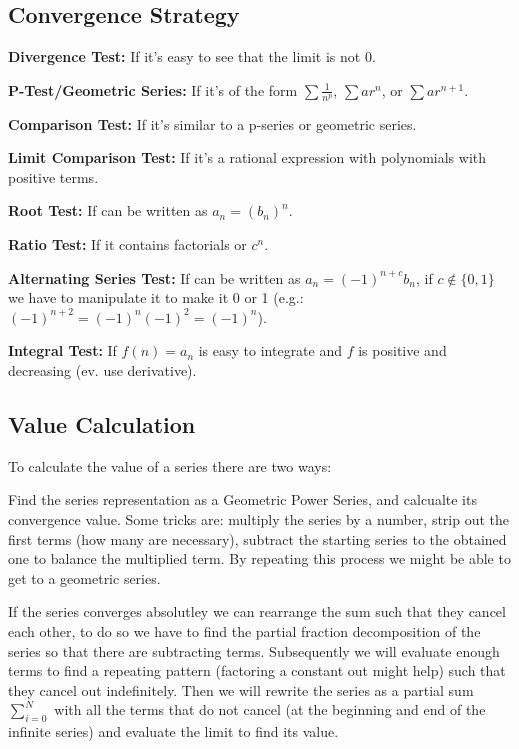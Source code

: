 \documentclass[8pt,a4paper]{extarticle}     %
\theoremstyle{definition}
\theoremstyle{definition}
\theoremstyle{definition}
\begin{document}
\begin{multicols}{4}
\subsection{Convergence Strategy}
\begin{numberlist}
	\item \textbf{Divergence Test:} If it's easy to see that the limit is not 0. 
	\item \textbf{P-Test/Geometric Series:} If it's of the form $\sum \frac{1}{n^p}$, $\sum ar^n$, or $\sum ar^{n+1}$.
	\item \textbf{Comparison Test:} If it's similar to a p-series or geometric series. 
	\item \textbf{Limit Comparison Test:} If it's a rational expression with polynomials with positive terms.
	\item \textbf{Root Test:} If can be written as $a_n = (b_n)^n$.
	\item \textbf{Ratio Test:} If it contains factorials or $c^n$.
	\item \textbf{Alternating Series Test:} If can be written as $a_n=(-1)^{n+c}b_n$, if $c\notin\{0,1\}$ we have to manipulate it to make it 0 or 1 (e.g.: $(-1)^{n+2} = (-1)^n(-1)^2=(-1)^n$).
	\item \textbf{Integral Test:} If $f(n) = a_n$ is easy to integrate and $f$ is positive and decreasing (ev. use derivative). 
\end{numberlist}
\subsection{Value Calculation}
To calculate the value of a series there are two ways:
\begin{numberlist}
	\item Find the series representation as a Geometric Power Series, and calcualte its convergence value. Some tricks are: multiply the series by a number, strip out the first terms (how many are necessary), subtract the starting series to the obtained one to balance the multiplied term. By repeating this process we might be able to get to a geometric series. 
	\item If the series converges absolutley we can rearrange the sum such that they cancel each other, to do so we have to find the partial fraction decomposition of the series so that there are subtracting terms. Subsequently we will evaluate enough terms to find a repeating pattern (factoring a constant out might help) such that they cancel out indefinitely. Then we will rewrite the series as a partial sum $\sum_{i=0}^N$ with all the terms that do not cancel (at the beginning and end of the infinite series) and evaluate the limit to find its value. 
\end{numberlist}


\end{multicols}
\end{document}
